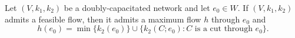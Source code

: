 Let $(V, k_1, k_2)$ be a doubly-capacitated network and let $e_0 \in W$. If $(V, k_1, k_2)$ admits a feasible flow, then it admits a maximum flow $h$ through $e_0$ and
$$h(e_0) = \min\bigl\{ k_2(e_0) \bigr\} \cup \bigl\{ k_2(C; e_0) : C \text{ is a cut through } e_0 \bigr\}.$$
